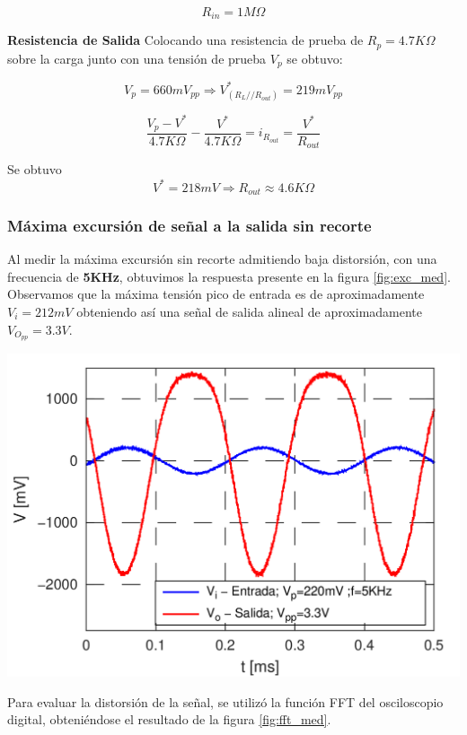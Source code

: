 \documentclass[a4paper, 10pt, spanish]{article}
\begin{document}
\begin{equation}
  R_{in}=1M\Omega
\end{equation}

\textbf{Resistencia de Salida}
Colocando una resistencia de prueba de $R_p = 4.7K\Omega$ sobre la carga junto con una tensión de prueba $V_p$ se obtuvo:

\begin{equation}
  V_p= 660mV_{pp} \Rightarrow V^*_{(R_L//R_{out})} = 219 mV_{pp}
\end{equation}

\begin{equation}
  \frac{V_p - V^*}{4.7K\Omega} - \frac{V^*}{4.7K\Omega} = i_{R_{out}} = \frac{V^*}{R_{out}}
\end{equation}

Se obtuvo
\begin{equation}
  V^* = 218mV \Rightarrow R_{out} \approx 4.6K\Omega
\end{equation}

\subsubsection{Máxima excursión de señal a la salida sin recorte}
Al medir la máxima excursión sin recorte admitiendo baja distorsión, con una frecuencia de \textbf{5KHz}, obtuvimos la respuesta presente en la figura \ref{fig:exc_med}. Observamos que la máxima tensión pico de entrada es de aproximadamente $V_i=212mV$ obteniendo así una señal de salida alineal de aproximadamente $V_{O_{pp}}=3.3V$.

\begin{center}
  \includegraphics[width=.7\textwidth]{excursion.png}
  \label{fig:exc_med}
\end{center}

Para evaluar la distorsión de la señal, se utilizó la función FFT del osciloscopio digital, obteniéndose el resultado de la figura \ref{fig:fft_med}.
\end{document}
